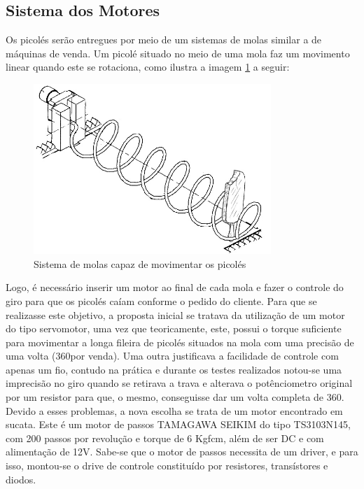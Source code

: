 \subsection{Sistema dos Motores}
Os picolés serão entregues por meio de um sistemas de molas similar a de máquinas de venda. Um picolé situado no meio de uma mola faz um movimento linear quando este se rotaciona, como ilustra a imagem \ref{fig:sistema_molas} a seguir:

\begin{figure}[H]
	\centering
    \includegraphics[width=0.8\textwidth]{figuras/sistema_molas}
    \caption{Sistema de molas capaz de movimentar os picolés}
    \label{fig:sistema_molas}
\end{figure}

Logo, é necessário inserir um motor ao final de cada mola e fazer o controle do giro para que os picolés caíam conforme o pedido do cliente. Para que se realizasse este objetivo, a proposta inicial se tratava da utilização de um motor do tipo servomotor, uma vez que teoricamente, este, possui o torque suficiente para movimentar a longa fileira de picolés situados na mola com uma precisão de uma volta (360\degree por venda). Uma outra justificava a facilidade de controle com apenas um fio, contudo na prática e durante os testes realizados notou-se uma imprecisão no giro quando se retirava a trava e alterava o potênciometro original por um resistor para que, o mesmo, conseguisse dar um volta completa de 360\degree. Devido a esses problemas, a nova escolha se trata de um motor encontrado em sucata. Este é um motor de passos TAMAGAWA SEIKIM do tipo TS3103N145, com 200 passos por revolução e torque de 6 Kgfcm, além de ser DC e com alimentação de 12V.
Sabe-se que o motor de passos necessita de um driver, e para isso, montou-se o drive de controle constituído por resistores, transístores e diodos.

